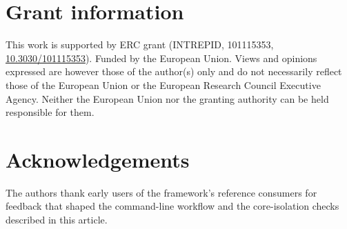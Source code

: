 \documentclass[10pt,a4paper]{article}
\begin{document}
\section*{Grant information}
This work is supported by ERC grant (INTREPID, 101115353, \href{https://doi.org/10.3030/101115353}{10.3030/101115353}). Funded by the European Union. Views and opinions expressed are however those of the author(s) only and do not necessarily reflect those of the European Union or the European Research Council Executive Agency. Neither the European Union nor the granting authority can be held responsible for them.

\section*{Acknowledgements}
The authors thank early users of the framework's reference consumers for
feedback that shaped the command-line workflow and the core-isolation
checks described in this article.

\end{document}
